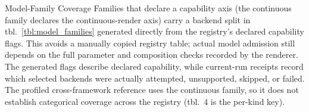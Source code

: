 \documentclass[
  ignorenonframetext,
]{beamer}
\begin{document}
\begin{frame}{Model-Family Coverage}
Families that declare a capability axis (the continuous family declares
the continuous-render axis) carry a backend split in
tbl.~\ref{tbl:model_families} generated directly from the registry's
declared capability flags. This avoids a manually copied registry table;
actual model admission still depends on the full parameter and
composition checks recorded by the renderer. The generated flags
describe declared capability, while current-run receipts record which
selected backends were actually attempted, unsupported, skipped, or
failed. The profiled cross-framework reference uses the continuous
family, so it does not establish categorical coverage across the
registry (tbl.~4 is the per-kind key).

\end{frame}
\end{document}
